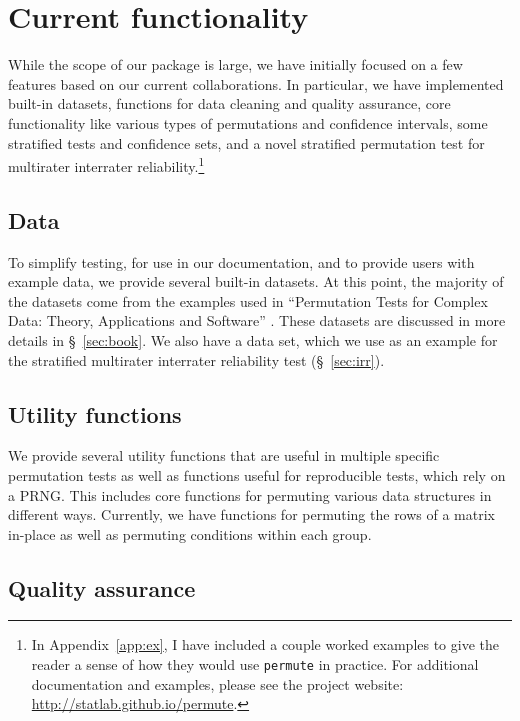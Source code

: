 \chapter{\label{ch:func}Current functionality}

While the scope of our package is large, we have initially focused on a few
features based on our current collaborations.  In particular, we have
implemented built-in datasets, functions for data cleaning and quality
assurance, core functionality like various types of permutations and confidence
intervals, some stratified tests and confidence sets, and a novel stratified
permutation test for multirater interrater reliability.\footnote{In
Appendix~\ref{app:ex}, I have included a couple worked examples to give the
reader a sense of how they would use \texttt{permute} in practice.  For
additional documentation and examples, please see the project website:
\url{http://statlab.github.io/permute}.}

\section{Data}

To simplify testing, for use in our documentation, and to provide users with
example data, we provide several built-in datasets. At this point, the majority
of the datasets come from the examples used in ``Permutation Tests for Complex
Data: Theory, Applications and Software'' \cite{pesarin2010permutation}.  These
datasets are discussed in more details in \S~\ref{sec:book}.  We also have a
data set, which we use as an example for the stratified multirater interrater
reliability test (\S~\ref{sec:irr}).

\section{Utility functions}

We provide several utility functions that are useful in multiple specific
permutation tests as well as functions useful for reproducible tests, which
rely on a PRNG.  This includes core functions for permuting various data
structures in different ways.  Currently, we have functions for permuting the
rows of a matrix in-place as well as permuting conditions within each group.

\section{Quality assurance}

